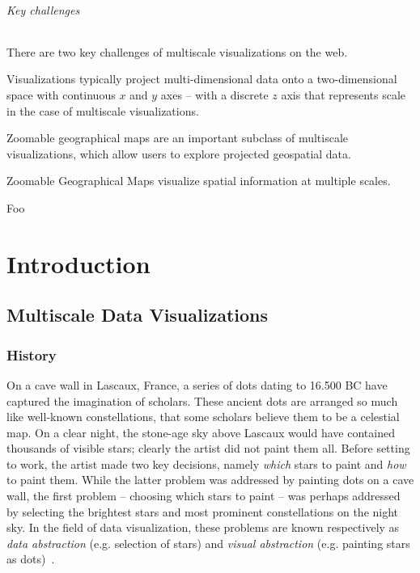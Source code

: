 \documentclass[11pt, oneside]{report}   	%
\begin{document}
\paragraph{Key challenges}
There are two key challenges of multiscale visualizations on the web. 

Visualizations typically project multi-dimensional data onto a two-dimensional space with continuous $x$ and $y$ axes -- with a discrete $z$ axis that represents scale in the case of multiscale visualizations. 






Zoomable geographical maps are an important subclass of multiscale visualizations, which allow users to explore projected geospatial data. 





Zoomable Geographical Maps visualize spatial information at multiple scales.



Foo


\part{Introduction}

\chapter{Multiscale Data Visualizations}

\section{History}
\label{sec:history}
On a cave wall in Lascaux, France, a series of dots dating to 16.500 BC have captured the imagination of scholars. These ancient dots are arranged so much like well-known constellations, that some scholars believe them to be a celestial map. On a clear night, the stone-age sky above Lascaux would have contained thousands of visible stars; clearly the artist did not paint them all. Before setting to work, the artist made two key decisions, namely \emph{which} stars to paint and \emph{how} to paint them. While the latter problem was addressed by painting dots on a cave wall, the first problem -- choosing which stars to paint -- was perhaps addressed by selecting the brightest stars and most prominent constellations on the night sky. In the field of data visualization, these problems are known respectively as \emph{data abstraction} (e.g. selection of stars) and \emph{visual abstraction} (e.g. painting stars as dots)~\cite{stolte2003multiscale}.
\end{document}
